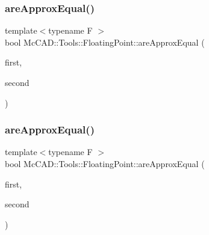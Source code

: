 \subsubsection{\texorpdfstring{are\+Approx\+Equal()}{areApproxEqual()}\hspace{0.1cm}{\footnotesize\ttfamily [3/4]}}
{\footnotesize\ttfamily template$<$typename F $>$ \\
bool Mc\+C\+A\+D\+::\+Tools\+::\+Floating\+Point\+::are\+Approx\+Equal (\begin{DoxyParamCaption}\item[{const \hyperlink{classMcCAD_1_1Tools_1_1FloatingPoint_1_1BinaryDecomposition}{Binary\+Decomposition}$<$ F $>$ \&}]{first,  }\item[{const \hyperlink{classMcCAD_1_1Tools_1_1FloatingPoint_1_1BinaryDecomposition}{Binary\+Decomposition}$<$ F $>$ \&}]{second }\end{DoxyParamCaption})}

\mbox{\label{namespaceMcCAD_1_1Tools_1_1FloatingPoint_aa68a5da68caedadf1e341ecd48ac65f6}} 
\subsubsection{\texorpdfstring{are\+Approx\+Equal()}{areApproxEqual()}\hspace{0.1cm}{\footnotesize\ttfamily [4/4]}}
{\footnotesize\ttfamily template$<$typename F $>$ \\
bool Mc\+C\+A\+D\+::\+Tools\+::\+Floating\+Point\+::are\+Approx\+Equal (\begin{DoxyParamCaption}\item[{const \hyperlink{classMcCAD_1_1Tools_1_1FloatingPoint_1_1DecimalDecomposition}{Decimal\+Decomposition}$<$ F $>$ \&}]{first,  }\item[{const \hyperlink{classMcCAD_1_1Tools_1_1FloatingPoint_1_1DecimalDecomposition}{Decimal\+Decomposition}$<$ F $>$ \&}]{second }\end{DoxyParamCaption})}

\mbox{\label{namespaceMcCAD_1_1Tools_1_1FloatingPoint_a6c28bdd3911b4023aef2ba97905fca48}} 
